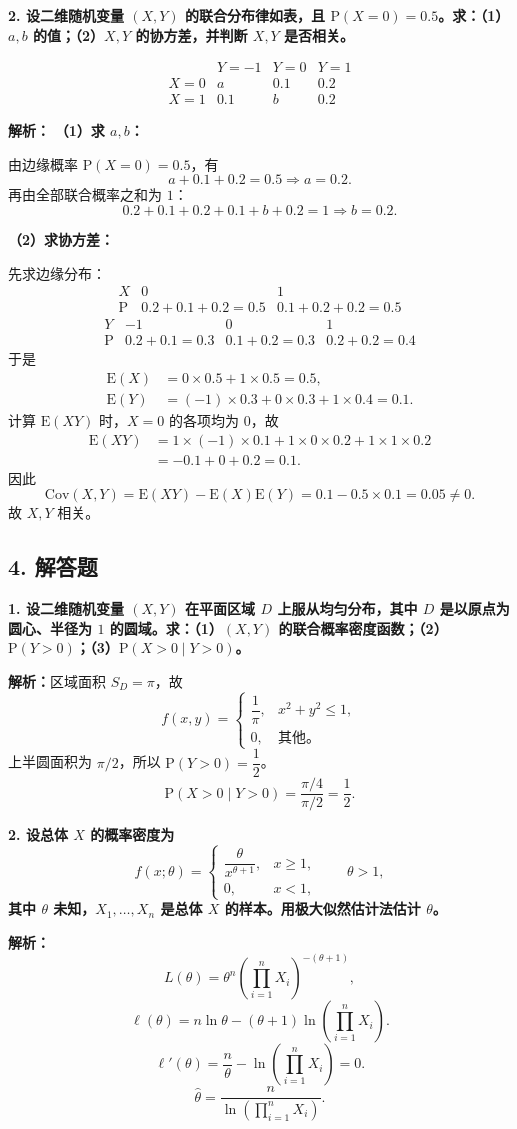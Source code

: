 ﻿\documentclass[UTF8,11pt,a4paper]{ctexart}
\newcommand{\Pp}{\mathrm{P}}
\newcommand{\E}{\mathrm{E}}
\newcommand{\Cov}{\mathrm{Cov}}
\newcommand{\Ana}[1]{\par\textbf{解析：}#1\par\medskip}
\newcommand{\Q}[1]{\par\textbf{#1}\par}
\begin{document}
\Q{2. 设二维随机变量 $(X,Y)$ 的联合分布律如表，且 $\Pp(X=0)=0.5$。求：（1）$a,b$ 的值；（2）$X,Y$ 的协方差，并判断 $X,Y$ 是否相关。}
\[
\begin{array}{c|ccc}&Y=-1&Y=0&Y=1\\\hline
X=0&a&0.1&0.2\\
X=1&0.1&b&0.2
\end{array}
\]
\Ana{
\textbf{（1）求 $a,b$：}

由边缘概率 $\Pp(X=0)=0.5$，有
\[
a+0.1+0.2=0.5\Rightarrow a=0.2.
\]
再由全部联合概率之和为 $1$：
\[
0.2+0.1+0.2+0.1+b+0.2=1
\Rightarrow b=0.2.
\]

\textbf{（2）求协方差：}

先求边缘分布：
\[
\begin{array}{c|cc}
X&0&1\\\hline
\Pp&0.2+0.1+0.2=0.5&0.1+0.2+0.2=0.5
\end{array}
\]
\[
\begin{array}{c|ccc}
Y&-1&0&1\\\hline
\Pp&0.2+0.1=0.3&0.1+0.2=0.3&0.2+0.2=0.4
\end{array}
\]
于是
\[
\begin{aligned}
\E(X)&=0\times0.5+1\times0.5=0.5,\\
\E(Y)&=(-1)\times0.3+0\times0.3+1\times0.4=0.1.
\end{aligned}
\]
计算 $\E(XY)$ 时，$X=0$ 的各项均为 $0$，故
\[
\begin{aligned}
\E(XY)
&=1\times(-1)\times0.1+1\times0\times0.2+1\times1\times0.2\\
&=-0.1+0+0.2=0.1.
\end{aligned}
\]
因此
\[
\Cov(X,Y)=\E(XY)-\E(X)\E(Y)=0.1-0.5\times0.1=0.05\ne0.
\]
故 $X,Y$ 相关。
}

\subsection*{4. 解答题}
\Q{1. 设二维随机变量 $(X,Y)$ 在平面区域 $D$ 上服从均匀分布，其中 $D$ 是以原点为圆心、半径为 $1$ 的圆域。求：（1）$(X,Y)$ 的联合概率密度函数；（2）$\Pp(Y>0)$；（3）$\Pp(X>0\mid Y>0)$。}
\Ana{区域面积 $S_D=\pi$，故
\[
f(x,y)=\begin{cases}\dfrac1\pi,&x^2+y^2\le1,\\0,&\text{其他}。\end{cases}
\]
上半圆面积为 $\pi/2$，所以 $\Pp(Y>0)=\dfrac12$。
\[
\Pp(X>0\mid Y>0)=\frac{\pi/4}{\pi/2}=\frac12.
\]}

\Q{2. 设总体 $X$ 的概率密度为
\[
f(x;\theta)=\begin{cases}\dfrac{\theta}{x^{\theta+1}},&x\ge1,\\0,&x<1,\end{cases}\qquad\theta>1,
\]
其中 $\theta$ 未知，$X_1,\ldots,X_n$ 是总体 $X$ 的样本。用极大似然估计法估计 $\theta$。}
\Ana{
\[
L(\theta)=\theta^n\left(\prod_{i=1}^nX_i\right)^{-(\theta+1)},
\]
\[
\ell(\theta)=n\ln\theta-(\theta+1)\ln\left(\prod_{i=1}^nX_i\right).
\]
\[
\ell'(\theta)=\frac n\theta-\ln\left(\prod_{i=1}^nX_i\right)=0.
\]
\[
\hat\theta=\frac{n}{\ln\left(\prod_{i=1}^nX_i\right)}.
\]}
\end{document}
